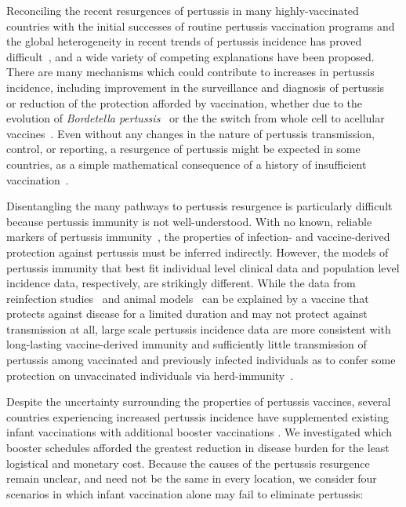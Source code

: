 \documentclass[12pt]{article}
\begin{document}
Reconciling the recent resurgences of pertussis in many highly-vaccinated countries
with
the initial successes of routine pertussis vaccination programs
and the global heterogeneity in recent trends of pertussis incidence
has proved difficult~\cite{Jackson&Rohani:2013}, 
and a wide variety of competing explanations have been proposed.
There are many mechanisms which could contribute to increases in pertussis incidence,
including improvement in the surveillance and diagnosis of pertussis~\cite{Cherry:2003, Cherry:2012}
or reduction of the protection afforded by vaccination, 
whether due to the evolution of \textit{Bordetella pertussis}~\cite{Mooi_et:2001} or the
the switch from whole cell to acellular vaccines~\cite{Shapiro:2012}.
Even without any changes in the nature of pertussis transmission, control, or reporting,
a resurgence of pertussis might be expected in some countries,
as a simple mathematical consequence of a history of insufficient vaccination~\cite{Riolo_et:2013}.

Disentangling the many pathways to pertussis resurgence is particularly difficult
because pertussis immunity is not well-understood. 
With no known, reliable markers of pertussis immunity~\cite{Farizo_et:2014}, 
the properties of infection- and vaccine-derived protection against pertussis
must be inferred indirectly.
However, the models of pertussis immunity that best fit
individual level clinical data and population level incidence data, respectively,
are strikingly different.
While 
the data from reinfection studies~\cite{Jenkinson:1988} and animal models~\cite{Warfel_et:2014}
can be explained by
a vaccine that protects against disease for a limited duration
and may not protect against transmission at all,
large scale pertussis incidence data
are more consistent with
long-lasting vaccine-derived immunity and 
sufficiently little transmission of pertussis among
vaccinated and previously infected individuals
as to confer some protection on unvaccinated individuals 
via herd-immunity~\cite{Nielsen_et:1994,Wearing&Rohani:2009, Blackwood_et:2013}.

Despite the uncertainty surrounding the properties of pertussis vaccines, 
several countries experiencing increased pertussis incidence
have supplemented existing infant vaccinations with additional
booster vaccinations \cite{Zepp_et:2011}.
We investigated which booster schedules afforded the greatest reduction in disease burden
for the least logistical and monetary cost. 
Because the causes of the pertussis resurgence remain unclear, 
and need not be the same in every location, 
we consider four scenarios 
in which infant vaccination alone may fail to eliminate pertussis:
\end{document}

